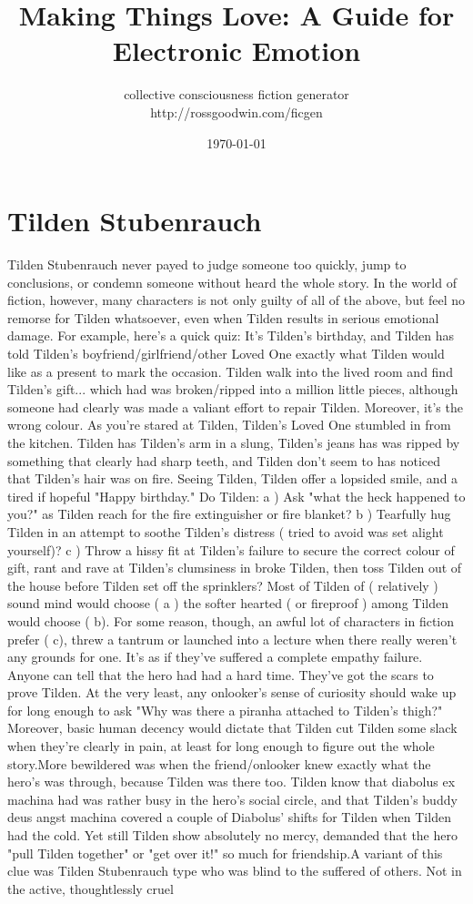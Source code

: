 \documentclass[12pt]{book}
\title{Making Things Love: A Guide for Electronic Emotion}
\author{collective consciousness fiction generator\\http://rossgoodwin.com/ficgen}
\date{\today}
\begin{document}
\maketitle



\chapter{Tilden Stubenrauch}

Tilden Stubenrauch never payed to judge someone too quickly, jump to conclusions, or condemn someone without heard the whole story. In the world of fiction, however, many characters is not only guilty of all of the above, but feel no remorse for Tilden whatsoever, even when Tilden results in serious emotional damage. For example, here's a quick quiz: It's Tilden's birthday, and Tilden has told Tilden's boyfriend/girlfriend/other Loved One exactly what Tilden would like as a present to mark the occasion. Tilden walk into the lived room and find Tilden's gift... which had was broken/ripped into a million little pieces, although someone had clearly was made a valiant effort to repair Tilden. Moreover, it's the wrong colour. As you're stared at Tilden, Tilden's Loved One stumbled in from the kitchen. Tilden has Tilden's arm in a slung, Tilden's jeans has was ripped by something that clearly had sharp teeth, and Tilden don't seem to has noticed that Tilden's hair was on fire. Seeing Tilden, Tilden offer a lopsided smile, and a tired if hopeful "Happy birthday." Do Tilden: a ) Ask "what the heck happened to you?" as Tilden reach for the fire extinguisher or fire blanket? b ) Tearfully hug Tilden in an attempt to soothe Tilden's distress ( tried to avoid was set alight yourself)? c ) Throw a hissy fit at Tilden's failure to secure the correct colour of gift, rant and rave at Tilden's clumsiness in broke Tilden, then toss Tilden out of the house before Tilden set off the sprinklers? Most of Tilden of ( relatively ) sound mind would choose ( a )  the softer hearted ( or fireproof ) among Tilden would choose ( b). For some reason, though, an awful lot of characters in fiction prefer ( c), threw a tantrum or launched into a lecture when there really weren't any grounds for one. It's as if they've suffered a complete empathy failure. Anyone can tell that the hero had had a hard time. They've got the scars to prove Tilden. At the very least, any onlooker's sense of curiosity should wake up for long enough to ask "Why was there a piranha attached to Tilden's thigh?" Moreover, basic human decency would dictate that Tilden cut Tilden some slack when they're clearly in pain, at least for long enough to figure out the whole story.More bewildered was when the friend/onlooker knew exactly what the hero's was through, because Tilden was there too. Tilden know that diabolus ex machina had was rather busy in the hero's social circle, and that Tilden's buddy deus angst machina covered a couple of Diabolus' shifts for Tilden when Tilden had the cold. Yet still Tilden show absolutely no mercy, demanded that the hero "pull Tilden together" or "get over it!" so much for friendship.A variant of this clue was Tilden Stubenrauch type who was blind to the suffered of others. Not in the active, thoughtlessly cruel 
\end{document}

